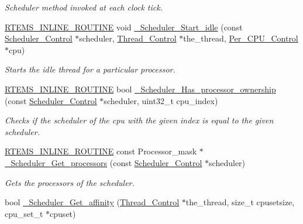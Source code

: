 \begin{DoxyCompactItemize}
\begin{DoxyCompactList}\small\item\em Scheduler method invoked at each clock tick. \end{DoxyCompactList}\item 
\mbox{\hyperlink{group__RTEMSScoreBaseDefs_gac216239df231d5dbd15e3520b0b9313f}{R\+T\+E\+M\+S\+\_\+\+I\+N\+L\+I\+N\+E\+\_\+\+R\+O\+U\+T\+I\+NE}} void \mbox{\hyperlink{group__RTEMSScoreScheduler_ga2d5003279953db715bd577c4f25531b6}{\+\_\+\+Scheduler\+\_\+\+Start\+\_\+idle}} (const \mbox{\hyperlink{struct__Scheduler__Control}{Scheduler\+\_\+\+Control}} $\ast$scheduler, \mbox{\hyperlink{struct__Thread__Control}{Thread\+\_\+\+Control}} $\ast$the\+\_\+thread, \mbox{\hyperlink{structPer__CPU__Control}{Per\+\_\+\+C\+P\+U\+\_\+\+Control}} $\ast$cpu)
\begin{DoxyCompactList}\small\item\em Starts the idle thread for a particular processor. \end{DoxyCompactList}\item 
\mbox{\hyperlink{group__RTEMSScoreBaseDefs_gac216239df231d5dbd15e3520b0b9313f}{R\+T\+E\+M\+S\+\_\+\+I\+N\+L\+I\+N\+E\+\_\+\+R\+O\+U\+T\+I\+NE}} bool \mbox{\hyperlink{group__RTEMSScoreScheduler_gad1000f1383cee31019d9b3c2a37f3532}{\+\_\+\+Scheduler\+\_\+\+Has\+\_\+processor\+\_\+ownership}} (const \mbox{\hyperlink{struct__Scheduler__Control}{Scheduler\+\_\+\+Control}} $\ast$scheduler, uint32\+\_\+t cpu\+\_\+index)
\begin{DoxyCompactList}\small\item\em Checks if the scheduler of the cpu with the given index is equal to the given scheduler. \end{DoxyCompactList}\item 
\mbox{\hyperlink{group__RTEMSScoreBaseDefs_gac216239df231d5dbd15e3520b0b9313f}{R\+T\+E\+M\+S\+\_\+\+I\+N\+L\+I\+N\+E\+\_\+\+R\+O\+U\+T\+I\+NE}} const Processor\+\_\+mask $\ast$ \mbox{\hyperlink{group__RTEMSScoreScheduler_gaa375cf17f43fdd86fcc85aa5394132a3}{\+\_\+\+Scheduler\+\_\+\+Get\+\_\+processors}} (const \mbox{\hyperlink{struct__Scheduler__Control}{Scheduler\+\_\+\+Control}} $\ast$scheduler)
\begin{DoxyCompactList}\small\item\em Gets the processors of the scheduler. \end{DoxyCompactList}\item 
bool \mbox{\hyperlink{group__RTEMSScoreScheduler_gab6fdb8d5560685f374c7756c9861acbe}{\+\_\+\+Scheduler\+\_\+\+Get\+\_\+affinity}} (\mbox{\hyperlink{struct__Thread__Control}{Thread\+\_\+\+Control}} $\ast$the\+\_\+thread, size\+\_\+t cpusetsize, cpu\+\_\+set\+\_\+t $\ast$cpuset)

\end{DoxyCompactItemize}
